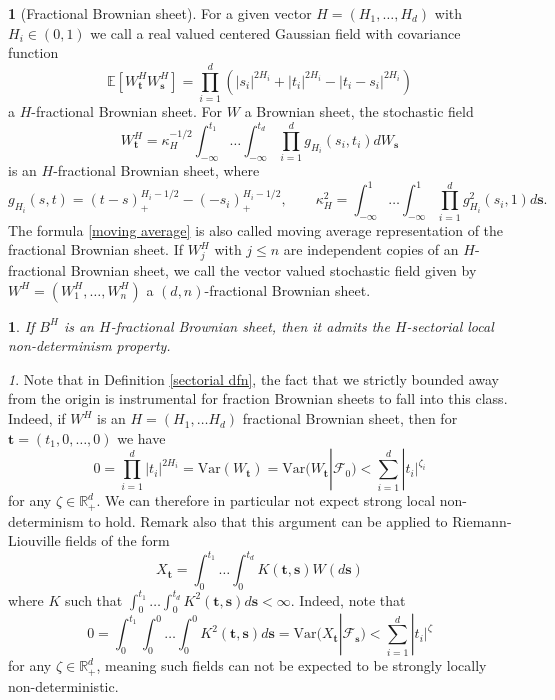 \documentclass[11pt,oneside,english,reqno]{amsart}
\numberwithin{equation}{section}
\numberwithin{figure}{section}
\theoremstyle{plain}
\theoremstyle{definition}
\newtheorem{defn}[thm]{\protect\definitionname}
\theoremstyle{remark}
\newtheorem{rem}[thm]{\protect\remarkname}
\theoremstyle{plain}
\theoremstyle{plain}
\theoremstyle{plain}
\theoremstyle{plain}
\newtheorem{example}[thm]{\protect\examplename}
\theoremstyle{plain}
\providecommand{\definitionname}{Definition}
\providecommand{\remarkname}{Remark}
\providecommand{\examplename}{Example}
\newcommand{\RR}{\mathbb{R}}
\newcommand{\bs}{\mathbf{s}}
\newcommand{\bt}{\mathbf{t}}
\begin{document}
\begin{defn}[Fractional Brownian sheet]
\label{fbs}
    For a given vector $H=(H_1, \dots, H_d)$ with $H_i \in (0,1)$ we call a real valued centered Gaussian field with covariance function 
    \[
    \mathbb{E}[W_\bt^HW_\bs^H]=\prod_{i=1}^d \left( |s_i|^{2H_i}+|t_i|^{2H_i}-|t_i-s_i|^{2H_i}\right)
    \]
    a $H$-fractional Brownian sheet. For $W$ a Brownian sheet, the stochastic field
    \begin{equation}
        W^H_\bt=\kappa_H^{-1/2}\int_{-\infty}^{t_1}\dots \int_{-\infty}^{t_d} \prod_{i=1}^d g_{H_i}(s_i, t_i)dW_{\bs}
        \label{moving average}
    \end{equation}
   is an $H$-fractional Brownian sheet, where
    \[
    g_{H_i}(s, t)=(t-s)_+^{H_i-1/2}-(-s_i)_+^{H_i-1/2}, \qquad \kappa_H^2=\int_{-\infty}^{1}\dots \int_{-\infty}^{1} \prod_{i=1}^d g^2_{H_i}(s_i, 1)d\bs.
    \]
    The formula \eqref{moving average} is also called moving average representation of the fractional Brownian sheet. If $W^H_{j}$ with $j\leq n$ are independent copies of an $H$-fractional Brownian sheet, we call the vector valued stochastic field given by $W^H=(W^H_1, \dots, W^H_n)$ a $(d, n)$-fractional Brownian sheet. 
\end{defn}


    
\begin{example}\cite[Theorem 1]{Wu2007}
If $B^H$ is an  $H$-fractional Brownian sheet, then it admits the $H$-sectorial local non-determinism property.
\end{example}

\begin{rem}
    \label{with zero}
    Note that in Definition \ref{sectorial dfn}, the fact that we strictly bounded away from the origin is instrumental for fraction Brownian sheets to fall into this class. Indeed, if $W^H$ is an $H=(H_1, \dots H_d)$ fractional Brownian sheet, then for $\bt=(t_1, 0, \dots, 0)$ we have
    \[
    0=\prod_{i=1}^d |t_i|^{2H_i}=\mbox{Var}(W_\bt)=\mbox{Var}(W_\bt |\mathcal{F}_0)<\sum_{i=1}^d |t_i|^{\zeta_i}
    \]
    for any $\zeta\in \RR^d_+$. We can therefore in particular not expect strong local non-determinism to hold. Remark also that this argument can be applied to Riemann-Liouville fields of the form 
    \[
    X_\bt=\int_{0}^{t_1}\dots \int_{0}^{t_d}K(\bt, \bs)W(d\bs)
    \]
    where $K$ such that $\int_{0}^{t_1}\dots \int_{0}^{t_d}K^2 (\bt, \bs)d\bs <\infty$. Indeed, note that
    \[
    0=\int_{0}^{t_1}\int_0^0\dots \int_{0}^{0}K^2(\bt, \bs)d\bs =\mbox{Var}(X_\bt |\mathcal{F}_\bs)<\sum_{i=1}^d |t_i|^\zeta
    \]
    for any $\zeta\in \RR^d_+$, meaning such fields can not be expected to be strongly locally non-deterministic. 
\end{rem}
\end{document}
